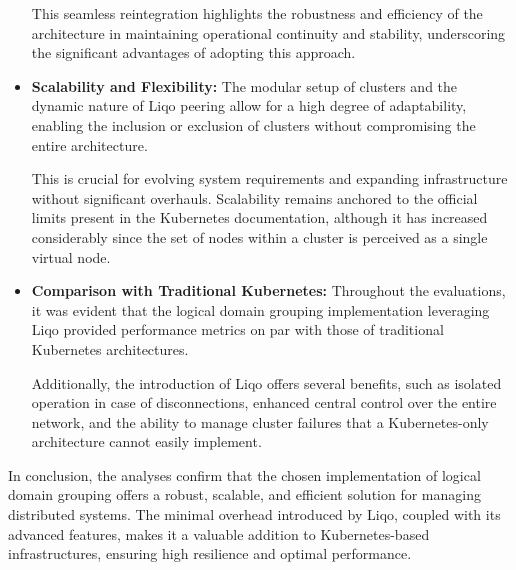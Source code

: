 \begin{itemize}
This seamless reintegration highlights the robustness and efficiency of the architecture in maintaining operational continuity and stability, underscoring the significant advantages of adopting this approach.

\item \textbf{Scalability and Flexibility:} The modular setup of clusters and the dynamic nature of Liqo peering allow for a high degree of adaptability, enabling the inclusion or exclusion of clusters without compromising the entire architecture. 

This is crucial for evolving system requirements and expanding infrastructure without significant overhauls. Scalability remains anchored to the official limits present in the Kubernetes documentation, although it has increased considerably since the set of nodes within a cluster is perceived as a single virtual node.

\item \textbf{Comparison with Traditional Kubernetes:} Throughout the evaluations, it was evident that the logical domain grouping implementation leveraging Liqo provided performance metrics on par with those of traditional Kubernetes architectures. 

Additionally, the introduction of Liqo offers several benefits, such as isolated operation in case of disconnections, enhanced central control over the entire network, and the ability to manage cluster failures that a Kubernetes-only architecture cannot easily implement.
\end{itemize}

In conclusion, the analyses confirm that the chosen implementation of logical domain grouping  offers a robust, scalable, and efficient solution for managing distributed systems. The minimal overhead introduced by Liqo, coupled with its advanced features, makes it a valuable addition to Kubernetes-based infrastructures, ensuring high resilience and optimal performance.
